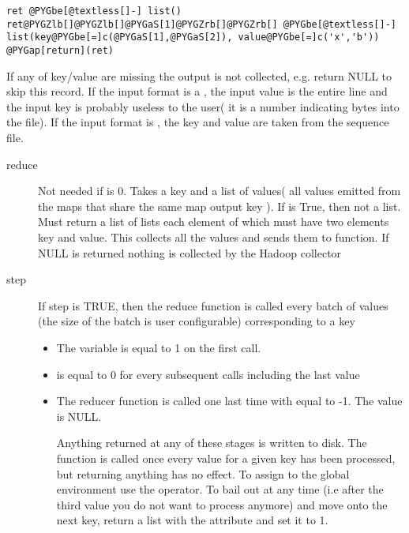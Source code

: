 \documentclass[letterpaper,10pt,english]{manual}
\begin{document}
\begin{Verbatim}[commandchars=@\[\]]
ret @PYGbe[@textless[]-] list()
ret@PYGZlb[]@PYGZlb[]@PYGaS[1]@PYGZrb[]@PYGZrb[] @PYGbe[@textless[]-]  list(key@PYGbe[=]c(@PYGaS[1],@PYGaS[2]), value@PYGbe[=]c('x','b'))
@PYGap[return](ret)
\end{Verbatim}

If any of key/value are missing the output is not collected, e.g. return NULL
to skip this record. If the input format is a , the input
value is the entire line and the input key is probably useless to the user( it is a number indicating bytes into the file). If the input format is , the key and value are taken from the sequence file.
\begin{description}
\item[reduce]
Not needed if  is 0. Takes a key and a list of
values( all values emitted from the maps that share the same map output key
). If  is True, then not a list. Must return a list of lists each
element of which must have two elements key and value. This collects all the
values and sends them to function. If NULL is returned nothing is collected
by the Hadoop collector

\item[step]
If step is TRUE, then the reduce function is called every batch of values
(the size of the batch is user configurable) corresponding to a key
\begin{itemize}
\item {} 
The variable  is equal to 1 on the first call.

\item {} 
 is equal to 0 for every subsequent calls including the last value

\item {} 
The reducer function is called one last time with  equal to -1. The value is NULL.

Anything returned at any of these stages is written to disk. The
 function is called once every value for a given key has been
processed, but returning anything has no effect. To assign to the
global environment use the \code{\textless{}\textless{}-} operator. To bail out at any time
(i.e after the third value you do not want to process anymore) and
move onto the next key, return a list with the attribute  and
set it to 1.

\end{itemize}


\end{description}
\end{document}
